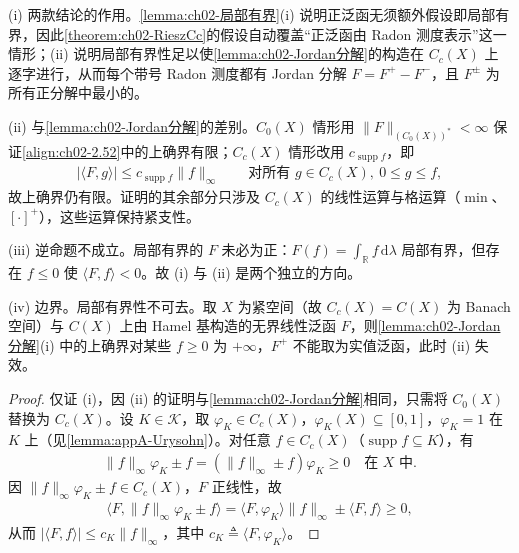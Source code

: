 \documentclass[../../main.tex]{subfiles}%
\begin{document}
\begin{remark}\label{remark:ch02-CcJordan}
(i) 两款结论的作用。\cref{lemma:ch02-局部有界}(i) 说明正泛函无须额外假设即局部有界，因此\cref{theorem:ch02-RieszCc}的假设自动覆盖“正泛函由 Radon 测度表示”这一情形；(ii) 说明局部有界性足以使\cref{lemma:ch02-Jordan分解}的构造在 $C_c(X)$ 上逐字进行，从而每个带号 Radon 测度都有 Jordan 分解 $F=F^+-F^-$，且 $F^\pm$ 为所有正分解中最小的。

(ii) 与\cref{lemma:ch02-Jordan分解}的差别。$C_0(X)$ 情形用 $\|F\|_{(C_0(X))^*}<\infty$ 保证\eqref{align:ch02-2.52}中的上确界有限；$C_c(X)$ 情形改用 $c_{\operatorname{supp}f}$，即
\begin{align*}
|\langle F,g\rangle|\leqslant c_{\operatorname{supp}f}\|f\|_\infty\qquad\text{对所有 }g\in C_c(X),\ 0\leqslant g\leqslant f,
\end{align*}
故上确界仍有限。证明的其余部分只涉及 $C_c(X)$ 的线性运算与格运算（$\min$、$[\cdot]^+$），这些运算保持紧支性。

(iii) 逆命题不成立。局部有界的 $F$ 未必为正：$F(f)=\int_{\mathbb R}f\,\mathrm{d}\lambda$ 局部有界，但存在 $f\leqslant0$ 使 $\langle F,f\rangle<0$。故 (i) 与 (ii) 是两个独立的方向。

(iv) 边界。局部有界性不可去。取 $X$ 为紧空间（故 $C_c(X)=C(X)$ 为 Banach 空间）与 $C(X)$ 上由 Hamel 基构造的无界线性泛函 $F$，则\cref{lemma:ch02-Jordan分解}(i) 中的上确界对某些 $f\geqslant0$ 为 $+\infty$，$F^+$ 不能取为实值泛函，此时 (ii) 失效。
\end{remark}

\begin{proof}
仅证 (i)，因 (ii) 的证明与\cref{lemma:ch02-Jordan分解}相同，只需将 $C_0(X)$ 替换为 $C_c(X)$。设 $K\in\mathscr K$，取 $\varphi_K\in C_c(X)$，$\varphi_K(X)\subseteq[0,1]$，$\varphi_K=1$ 在 $K$ 上（见\cref{lemma:appA-Urysohn}）。对任意 $f\in C_c(X)$（$\operatorname{supp}f\subseteq K$），有
\begin{align*}
\|f\|_\infty\varphi_K\pm f=(\|f\|_\infty\pm f)\varphi_K\geqslant0\quad\text{在 }X\text{ 中}.
\end{align*}
因 $\|f\|_\infty\varphi_K\pm f\in C_c(X)$，$F$ 正线性，故
\begin{align*}
\langle F,\|f\|_\infty\varphi_K\pm f\rangle=\langle F,\varphi_K\rangle\|f\|_\infty\pm\langle F,f\rangle\geqslant0,
\end{align*}
从而 $|\langle F,f\rangle|\leqslant c_K\|f\|_\infty$，其中 $c_K\triangleq\langle F,\varphi_K\rangle$。
\end{proof}
\end{document}
